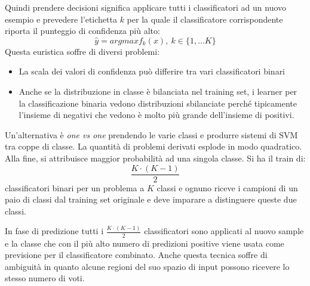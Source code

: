Quindi prendere decisioni significa applicare tutti i classificatori ad un nuovo
esempio e prevedere l'etichetta $k$ per la quale il classificatore corrispondente
riporta il punteggio di confidenza più alto:
\begin{equation}
    \hat{y} = argmax f_k(x), \ k \in \{1,\dots K\}
\end{equation}
Questa euristica soffre di diversi problemi:
\begin{itemize}
    \item La scala dei valori di confidenza può differire tra vari classificatori
          binari
    \item Anche se la distribuzione in classe è bilanciata nel training set, i
          learner per la classificazione binaria vedono distribuzioni sbilanciate
          perché tipicamente l'insieme di negativi che vedono è molto più grande
          dell'insieme di positivi.
\end{itemize}
Un'alternativa è \textit{one vs one} prendendo le varie classi e produrre sistemi
di SVM tra coppe di classe. La quantità di problemi derivati esplode in modo
quadratico. Alla fine, si attribuisce maggior probabilità ad una singola classe.
Si ha il train di:
\begin{equation}
    \frac{K \cdot (K - 1)}{2}
\end{equation}
classificatori binari per un problema a $K$ classi e ognuno riceve i campioni di
un paio di classi dal training set originale e deve imparare a distinguere queste
due classi.

In fase di predizione tutti i $\frac{K \cdot (K - 1)}{2}$ classificatori sono
applicati al nuovo sample e la classe che con il più alto numero di predizioni
positive viene usata come previsione per il classificatore combinato. Anche
questa tecnica soffre di ambiguità in quanto alcune regioni del suo spazio di
input possono ricevere lo stesso numero di voti.